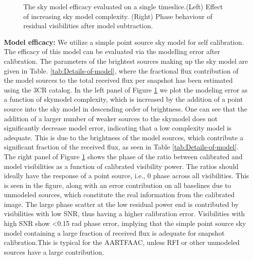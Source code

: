 \documentclass{aa}
\begin{document}
\begin{figure}[tbh]
\caption{\label{fig:The-model-amplitude}The  sky model  efficacy evaluated  on a
  single  timeslice.(Left) Effect  of increasing  sky model  complexity. (Right)
  Phase behaviour of residual visibilities after model subtraction.}
\end{figure}

\textbf{Model efficacy:  } We utilize a  simple point source sky  model for self
calibration. The efficacy of this model can be evaluated via the modelling error
after calibration.   The parameters of the  brightest sources making  up the sky
model are given in Table.  \ref{tab:Details-of-model}, where the fractional flux
contribution of  the model sources to  the total received flux  per snapshot has
been  estimated   using  the   3CR  catalog.  In   the  left  panel   of  Figure
\ref{fig:The-model-amplitude}  we  plot the  modeling  error  as  a function  of
skymodel complexity, which  is increased by the addition of  a point source into
the sky model  in descending order of brightness. One can  see that the addition
of a  larger number  of weaker  sources to the  skymodel does  not significantly
decrease model error, indicating that  a low complexity model is adequate.  This
is due  to the brightness of  the model sources, which  contribute a significant
fraction of the received flux, as seen in Table \ref{tab:Details-of-model}.  The
right panel of Figure \ref{fig:The-model-amplitude} shows the phase of the ratio
between calibrated and model visibilities as a function of calibrated visibility
power. The  ratios should ideally have the  response of a point  source, i.e., 0
phase across all visibilities.  This is  seen in the figure, along with an error
contribution on  all baselines  due to unmodeled  sources, which  constitute the
real information from  the calibrated image. The large phase  scatter at the low
residual power  end is contributed by  visibilities with low SNR,  thus having a
higher calibration error.  Visibilities with high SNR show <0.15 rad phase error,
implying that the  simple point source sky model containing  a large fraction of
received  flux is  adequate for  snapshot  calibration.This is  typical for  the
AARTFAAC, unless RFI or other unmodeled sources have a large contribution.
\end{document}
